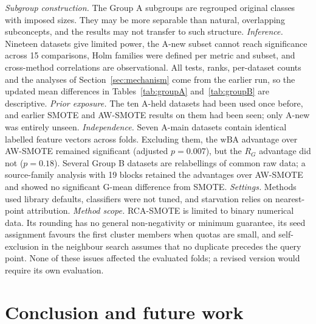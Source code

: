 \documentclass[preprint,nopreprintline]{elsarticle}
\theoremstyle{plain}
\theoremstyle{definition}
\newcommand{\wba}{\mathrm{wBA}}
\newcommand{\rg}{R_{G}}
\begin{document}
\emph{Subgroup construction.} The Group A subgroups are regrouped original classes with imposed sizes. They may be more separable than natural, overlapping subconcepts, and the results may not transfer to such structure. \emph{Inference.} Nineteen datasets give limited power, the A-new subset cannot reach significance across 15 comparisons, Holm families were defined per metric and subset, and cross-method correlations are observational. All tests, ranks, per-dataset counts and the analyses of Section~\ref{sec:mechanism} come from the earlier run, so the updated mean differences in Tables~\ref{tab:groupA} and~\ref{tab:groupB} are descriptive. \emph{Prior exposure.} The ten A-held datasets had been used once before, and earlier SMOTE and AW-SMOTE results on them had been seen; only A-new was entirely unseen. \emph{Independence.} Seven A-main datasets contain identical labelled feature vectors across folds. Excluding them, the $\wba$ advantage over AW-SMOTE remained significant (adjusted $p=0.007$), but the $\rg$ advantage did not ($p=0.18$). Several Group B datasets are relabellings of common raw data; a source-family analysis with 19 blocks retained the advantages over AW-SMOTE and showed no significant G-mean difference from SMOTE. \emph{Settings.} Methods used library defaults, classifiers were not tuned, and starvation relies on nearest-point attribution. \emph{Method scope.} RCA-SMOTE is limited to binary numerical data. Its rounding has no general non-negativity or minimum guarantee, its seed assignment favours the first cluster members when quotas are small, and self-exclusion in the neighbour search assumes that no duplicate precedes the query point. None of these issues affected the evaluated folds; a revised version would require its own evaluation.

\section{Conclusion and future work}\label{sec:conclusion}
\end{document}
